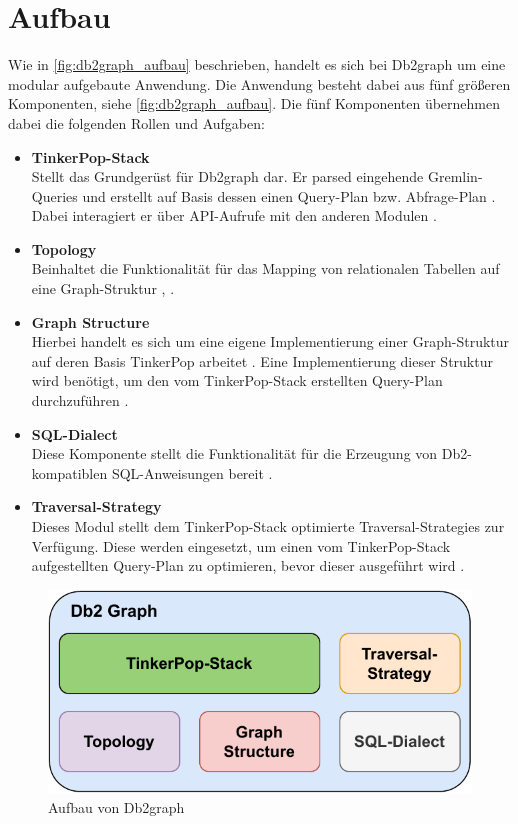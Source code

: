 \section{Aufbau}
Wie in \autoref{fig:db2graph_aufbau} beschrieben, handelt es sich bei Db2graph um eine modular aufgebaute Anwendung. Die Anwendung besteht dabei aus fünf größeren Komponenten, siehe \autoref{fig:db2graph_aufbau}. Die fünf Komponenten übernehmen dabei die folgenden Rollen und Aufgaben: 

\begin{itemize}
    \item \textbf{TinkerPop-Stack}\\Stellt das Grundgerüst für Db2graph dar. Er parsed eingehende Gremlin-Queries und erstellt auf Basis dessen einen Query-Plan bzw. Abfrage-Plan \cite{vldb_tian}. Dabei interagiert er über API-Aufrufe mit den anderen Modulen \cite{vldb_tian}.
    \item \textbf{Topology}\\Beinhaltet die Funktionalität für das Mapping von relationalen Tabellen auf eine Graph-Struktur \cite{vldb_tian}, \cite{sigmod_tian}.
    \item \textbf{Graph Structure}\\Hierbei handelt es sich um eine eigene Implementierung einer Graph-Struktur auf deren Basis TinkerPop arbeitet \cite{vldb_tian}. Eine Implementierung dieser Struktur wird benötigt, um den vom TinkerPop-Stack erstellten Query-Plan durchzuführen \cite{sigmod_tian}. 
    \item \textbf{SQL-Dialect}\\Diese Komponente stellt die Funktionalität für die Erzeugung von Db2-kompatiblen SQL-Anweisungen bereit \cite{sigmod_tian}.
    \item \textbf{Traversal-Strategy}\\Dieses Modul stellt dem TinkerPop-Stack optimierte Traversal-Strategies zur Verfügung. Diese werden eingesetzt, um einen vom TinkerPop-Stack aufgestellten Query-Plan zu optimieren, bevor dieser ausgeführt wird \cite{sigmod_tian}.  
\end{itemize}

\begin{figure}[h]
    \centering
    \includegraphics[width=\textwidth]{images/db2graph_components.pdf}
    \caption{Aufbau von Db2graph}
    \label{fig:db2graph_aufbau}
\end{figure}

